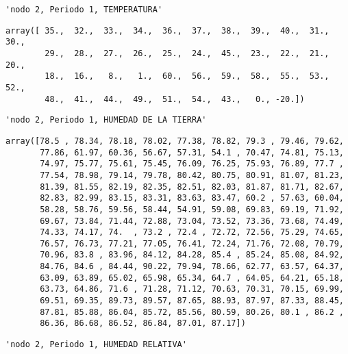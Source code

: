 \documentclass[11pt]{article}
\begin{document}
    
    
    \begin{verbatim}
'nodo 2, Periodo 1, TEMPERATURA'
    \end{verbatim}

    
    
    \begin{verbatim}
array([ 35.,  32.,  33.,  34.,  36.,  37.,  38.,  39.,  40.,  31.,  30.,
        29.,  28.,  27.,  26.,  25.,  24.,  45.,  23.,  22.,  21.,  20.,
        18.,  16.,   8.,   1.,  60.,  56.,  59.,  58.,  55.,  53.,  52.,
        48.,  41.,  44.,  49.,  51.,  54.,  43.,   0., -20.])
    \end{verbatim}

    
    
    \begin{verbatim}
'nodo 2, Periodo 1, HUMEDAD DE LA TIERRA'
    \end{verbatim}

    
    
    \begin{verbatim}
array([78.5 , 78.34, 78.18, 78.02, 77.38, 78.82, 79.3 , 79.46, 79.62,
       77.86, 61.97, 60.36, 56.67, 57.31, 54.1 , 70.47, 74.81, 75.13,
       74.97, 75.77, 75.61, 75.45, 76.09, 76.25, 75.93, 76.89, 77.7 ,
       77.54, 78.98, 79.14, 79.78, 80.42, 80.75, 80.91, 81.07, 81.23,
       81.39, 81.55, 82.19, 82.35, 82.51, 82.03, 81.87, 81.71, 82.67,
       82.83, 82.99, 83.15, 83.31, 83.63, 83.47, 60.2 , 57.63, 60.04,
       58.28, 58.76, 59.56, 58.44, 54.91, 59.08, 69.83, 69.19, 71.92,
       69.67, 73.84, 71.44, 72.88, 73.04, 73.52, 73.36, 73.68, 74.49,
       74.33, 74.17, 74.  , 73.2 , 72.4 , 72.72, 72.56, 75.29, 74.65,
       76.57, 76.73, 77.21, 77.05, 76.41, 72.24, 71.76, 72.08, 70.79,
       70.96, 83.8 , 83.96, 84.12, 84.28, 85.4 , 85.24, 85.08, 84.92,
       84.76, 84.6 , 84.44, 90.22, 79.94, 78.66, 62.77, 63.57, 64.37,
       63.09, 63.89, 65.02, 65.98, 65.34, 64.7 , 64.05, 64.21, 65.18,
       63.73, 64.86, 71.6 , 71.28, 71.12, 70.63, 70.31, 70.15, 69.99,
       69.51, 69.35, 89.73, 89.57, 87.65, 88.93, 87.97, 87.33, 88.45,
       87.81, 85.88, 86.04, 85.72, 85.56, 80.59, 80.26, 80.1 , 86.2 ,
       86.36, 86.68, 86.52, 86.84, 87.01, 87.17])
    \end{verbatim}

    
    
    \begin{verbatim}
'nodo 2, Periodo 1, HUMEDAD RELATIVA'
    \end{verbatim}
\end{document}
